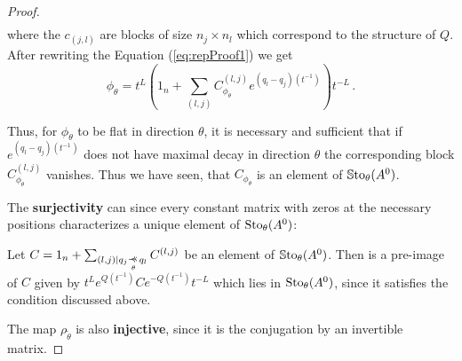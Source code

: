 \begin{proof}
\begin{align*}
  \end{align*}
  where the $c_{(j,l)}$ are blocks of size $n_j\times n_l$ which correspond to the structure of
  $Q$. After rewriting the Equation (\ref{eq:repProof1}) we get
  \[
    \phi_\theta=
      t^L\left(
        1_n+\sum_{(l,j)}C_{\phi_\theta}^{(l,j)}e^{(q_l-q_j)(t^{-1})}
      \right)t^{-L} \,.
  \]
  \begin{comment}
    \begin{align*}
      \phi_\theta(t)
      &=t^Le^{Q(t^{-1})}\left(
        1_n+C_{\phi_\theta}
      \right)e^{-Q(t^{-1})}t^{-L}
    \\&=t^Le^{Q(t^{-1})}\left(
        1_n+\sum_{(l,j)}C_{\phi_\theta}^{(l,j)}
      \right)e^{-Q(t^{-1})}t^{-L}
    \\&=t^L\left(
        1_n+\sum_{(l,j)}e^{Q(t^{-1})}C_{\phi_\theta}^{(l,j)}e^{-Q(t^{-1})}
      \right)t^{-L}
    \\&=t^L\left(
          1_n+\sum_{(l,j)}C_{\phi_\theta}^{(l,j)}e^{(q_l-q_j)(t^{-1})}
        \right)t^{-L} \,.
    \end{align*}
  \end{comment}
  Thus, for $\phi_{\theta}$ to be flat in direction $\theta$, it is
  necessary and sufficient that if $e^{(q_l-q_j)(t^{-1})}$ does not have
  maximal decay in direction $\theta$ the corresponding
  block $C_{\phi_\theta}^{(l,j)}$ vanishes.
  Thus we have seen, that $C_{\phi_\theta}$ is an
  element of $\operatorname{\mathbb{S}to}_\theta(A^0)$.

  The \textbf{surjectivity} can  since every
  constant matrix with zeros at the necessary positions characterizes a unique
  element of $\operatorname{Sto}_\theta(A^0)$:
  \begin{einr}
    Let $C=1_n + \sum_{(l,j)\mid q_j\myrel{\theta}q_l} C^{(l,j)}$ be an element
    of $\operatorname{\mathbb{S}to}_\theta(A^0)$.
    Then is a pre-image of $C$ given by
    $t^Le^{Q(t^{-1})}Ce^{-Q(t^{-1})}t^{-L}$ which lies in $\operatorname{Sto}_\theta(A^0)$,
    since it satisfies the condition discussed above.
  \end{einr}

  The map $\rho_{\tilde\theta}$ is also \textbf{injective}, since it is the
  conjugation by an invertible matrix.
\end{proof}

